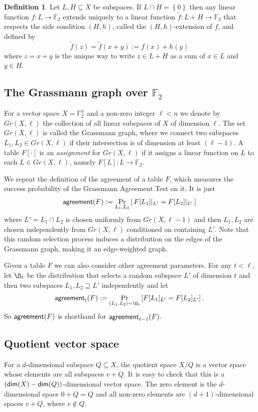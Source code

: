 \documentclass[11pt]{article}
\numberwithin{equation}{section}
\theoremstyle{definition}
\newtheorem{definition}[theorem]{Definition}
\theoremstyle{plain}
\newcommand\set[1]{{\left\{ #1 \right\}}}
\newcommand\Prob[2]{{\Pr_{#1}\left[ {#2} \right]}}
\newcommand*\dimm{{\sf dim}}
\renewcommand\subset{\subseteq}
\renewcommand\supset{\supseteq}
\def\F{\mathbb{F}}
\def\agr{{\sf agreement}}
\begin{document}
\begin{definition}\label{def:extension}
Let $L,H\subset X$ be subspaces. If $L\cap H=\set 0$ then any linear function $f:L\to\F_2$ extends uniquely to a linear function $\tilde f:L+H\to\F_2$ that respects the side condition $(H,h)$, called the $(H,h)$-extension of $f$, and defined by
\[ \tilde f(z) = \tilde f (x + y) := f(x) + h(y)
\] where $z=x+y$ is the unique way to write $z\in L+H$ as a sum of $x\in L$ and $y\in H$.
\end{definition}

\subsection{The Grassmann graph over \texorpdfstring{$\F_2$}{F\_2}}

For a vector space $X=\F_2^n$ and a non-zero integer $\ell<n$ we
denote by $Gr(X,\ell)$ the collection of all linear subspaces of $X$
of dimension $\ell$. The set  $Gr(X,\ell)$ is called the Grassmann graph, where we
connect two subspaces $L_1,L_2\in Gr(X,\ell)$ if their intersection is
of dimension at least $(\ell-1)$.
%
A table $F[\cdot]$ is an {\em assignment} for $Gr(X,\ell)$ if it
assigns a linear function on $L$  to each $L\in Gr(X,\ell)$, namely $F[L]:L\to \F_2$.

We repeat the definition of the agreement of a table $F$, which
measures the success probability of the Grassmann Agreement Test on it. It is just
\[ \agr(F) := \Prob{L_1,L_2}{\, F[L_1]|_{L'} = F[L_2]|_{L'}\, }
\]
where $L' = L_1\cap L_2$ is chosen uniformly from $Gr(X,\ell-1)$ and
then $L_1,L_2$ are chosen independently from $Gr(X,\ell)$ conditioned
on containing $L'$. Note that this random selection process induces a
distribution on the edges of the Grassmann graph, making it an
edge-weighted graph.

Given a table $F$ we can also consider other agreement parameters. For any $t < \ell$, let $\D_{t}$ be the distribution that selects a random subspace $L'$ of dimension $t$ and then two subspaces $L_1,L_2\supset L'$ independently and let
\begin{equation}\label{eq:agrt} \agr_{t}(F) := \Prob{(L_1,L_2)\sim \D_{t}}{F[L_1]_{L'} = F[L_2]_{L'}} \,.
\end{equation}
So $\agr(F)$ is shorthand for $\agr_{\ell-1}(F)$.

\subsection{Quotient vector space}
For a $d$-dimensional subspace $Q\subset X$, the quotient space $X/Q$ is a vector space whose elements are all subspaces $v + Q$. It is easy to check that this is a $(\dimm(X)-\dimm(Q))$-dimensional vector space. The zero element is the $d$-dimensional space $0+Q=Q$ and all non-zero elements are
$(d+1)$-dimensional
%
spaces $v+Q$, where $v\not\in Q$.
\end{document}
